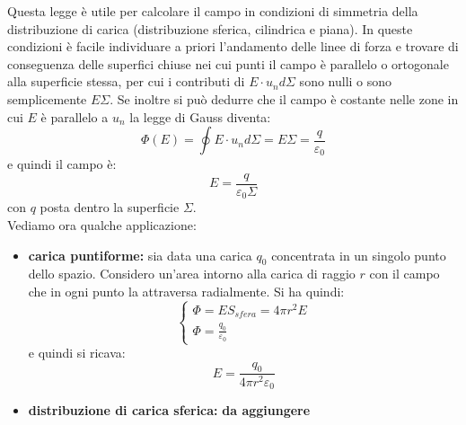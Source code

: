 \documentclass[a4paper,12pt, oneside]{book}
\begin{document}
Questa legge è utile per calcolare il campo in condizioni di simmetria della distribuzione di carica (distribuzione sferica, cilindrica e piana). In queste condizioni è facile individuare a priori l'andamento delle linee di forza e trovare di conseguenza delle superfici chiuse nei cui punti il campo è parallelo o ortogonale alla superficie stessa, per cui i contributi di $E\cdot u_nd\Sigma$ sono nulli o sono semplicemente $E\Sigma$. Se inoltre si può dedurre che il campo è costante nelle zone in cui $E$ è parallelo a $u_n$ la legge di Gauss diventa:
$$\Phi(E)=\oint E\cdot u_nd\Sigma=E\Sigma=\frac{q}{\varepsilon_0}$$
e quindi il campo è:
$$E=\frac{q}{\varepsilon_0\Sigma}$$
con $q$ posta dentro la superficie $\Sigma$.\\
Vediamo ora qualche applicazione:
\begin{itemize}
	\item \textbf{carica puntiforme:} sia data una carica $q_0$ concentrata in un singolo punto dello spazio. Considero un'area intorno alla carica di raggio $r$ con il campo che in ogni punto la attraversa radialmente. Si ha quindi:
	      $$
		      \begin{cases}
			      \Phi=ES_{sfera}=4\pi r^2 E \\
			      \Phi=\frac{q_0}{\varepsilon_0}
		      \end{cases}
	      $$
	      e quindi si ricava:
	      $$E=\frac{q_0}{4\pi r^2 \varepsilon_0}$$
	\item \textbf{distribuzione di carica sferica:}  \textbf{da aggiungere}

\end{itemize}
\end{document}

